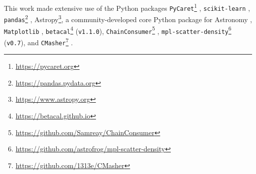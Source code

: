 \documentclass{aa}
\begin{document}
\begin{acknowledgements}
This work made extensive use of the Python packages \texttt{PyCaret}\footnote{\url{https://pycaret.org}} \citep[\texttt{v2.3.10};][]{PyCaret}, \texttt{scikit-learn} \citep[\texttt{v0.23.2};][]{scikit-learn}, \texttt{pandas}\footnote{\url{https://pandas.pydata.org}} \citep[\texttt{v1.4.2};][]{pandas}, Astropy\footnote{\url{https://www.astropy.org}}, a community-developed core Python package for Astronomy \citep[\texttt{v5.0};][]{astropy:2013, astropy:2018, 2022ApJ...935..167A}, \texttt{Matplotlib} \citep[\texttt{v3.5.1};][]{Hunter:2007}, \texttt{betacal}\footnote{\url{https://betacal.github.io}} (\texttt{v1.1.0}), \texttt{ChainConsumer}\footnote{\url{https://github.com/Samreay/ChainConsumer}} \citep[\texttt{v0.34};][]{Hinton2016}, \texttt{mpl-scatter-density}\footnote{\url{https://github.com/astrofrog/mpl-scatter-density}} (\texttt{v0.7}), and \texttt{CMasher}\footnote{\url{https://github.com/1313e/CMasher}} \citep[\texttt{v1.6.3};][]{2020JOSS....5.2004V}.
\end{acknowledgements}

%
%


\end{document}
